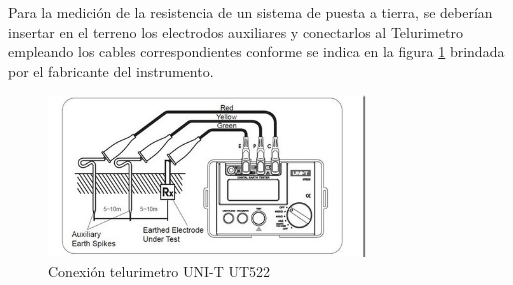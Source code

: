 \documentclass[12pt, letterpaper]{article}
\begin{document}
Para la medición de la resistencia de un sistema de puesta a tierra, se deberían
insertar en el terreno los electrodos auxiliares y conectarlos al Telurimetro empleando los
cables correspondientes conforme se indica en la figura \ref{fig:conexion_telurimetro} brindada por el fabricante del instrumento.
\begin{figure}[H]
	\centering
	\includegraphics[width=0.75\textwidth]{imagenes/conexion_telurimetro.jpg}
	\caption{Conexión telurimetro UNI-T UT522}
	\label{fig:conexion_telurimetro}
\end{figure}
\end{document}
